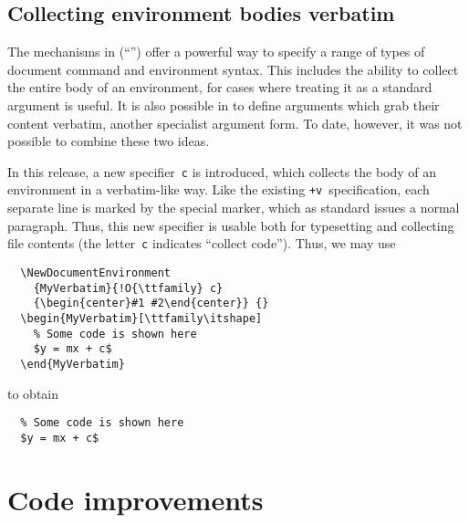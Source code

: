 \documentclass{ltnews}
\begin{document}
\subsection{Collecting environment bodies verbatim}

The mechanisms in  (\enquote{}) offer a powerful way to
specify a range of types of document command and environment syntax. This
includes the ability to collect the entire body of an environment, for cases
where treating it as a standard argument is useful. It is also possible in
 to define arguments which grab their content verbatim, another
specialist argument form. To date, however, it was not possible to combine
these two ideas.

In this release, a new specifier~\texttt{c} is introduced, which collects the
body of an environment in a verbatim-like way. Like the existing
\texttt{+v}~specification, each separate line is marked by the special
 marker, which as standard issues a normal paragraph. Thus, this
new specifier is usable both for typesetting and collecting file contents (the
letter~\texttt{c} indicates \enquote{collect code}). Thus, we may use
\begin{verbatim}
  \NewDocumentEnvironment
    {MyVerbatim}{!O{\ttfamily} c}
    {\begin{center}#1 #2\end{center}} {}
  \begin{MyVerbatim}[\ttfamily\itshape]
    % Some code is shown here
    $y = mx + c$
  \end{MyVerbatim}
\end{verbatim}
to obtain
\begin{center}
\makeatletter
\def\@verbatim{%
  \trivlist
  \centering
  \let \do \@makeother
  \dospecials
  \obeylines
  \normalfont \ttfamily \itshape
  \@noligs
}
\begin{verbatim}
  % Some code is shown here
  $y = mx + c$
\end{verbatim}
\end{center}

\section{Code improvements}
\end{document}
